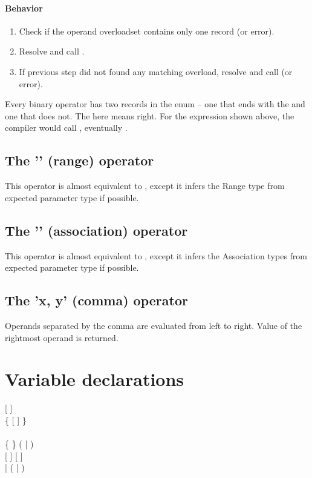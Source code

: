 \paragraph{Behavior}
\begin{enumerate}
	\item Check if the operand overloadset contains only one record (or error).
	\item Resolve and call .
	\item If previous step did not found any matching overload, resolve and call  (or error).
\end{enumerate}

Every binary operator has two records in the  enum -- one that ends with the  and one that does not. The  here means right. For the expression shown above, the compiler would call , eventually .

\subsection{The '' (range) operator}
This operator is almost equivalent to , except it infers the Range type from expected parameter type if possible.

\subsection{The '' (association) operator}
This operator is almost equivalent to , except it infers the Association types from expected parameter type if possible.

\subsection{The 'x, y' (comma) operator}
Operands separated by the comma are evaluated from left to right. Value of the rightmost operand is returned.

\section{Variable declarations}
\begin{grammar}
	   [  ] \\
		\grLn \{ \kwd{,}  [  ] \} \kwd{;} \\
	\\
	 \{  \} (  |  ) \\
	  [  ] [ \kwd{!} ] \\
	  | ( \kwd{=} | \kwd{:=} )  \\
\end{grammar}

